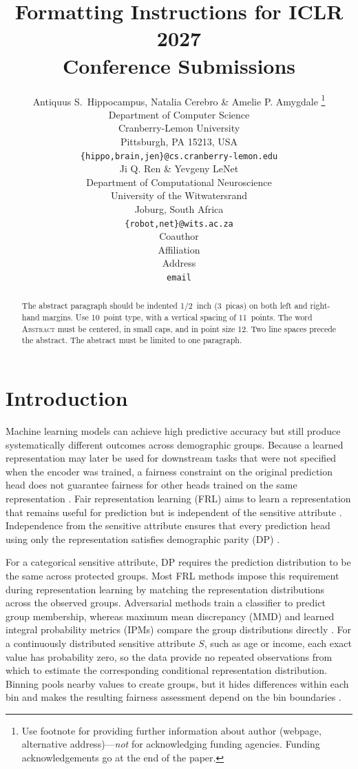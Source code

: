 \documentclass{article} %
\title{Formatting Instructions for ICLR 2027 \\ Conference Submissions}
\author{Antiquus S.~Hippocampus, Natalia Cerebro \& Amelie P. Amygdale \thanks{ Use footnote for providing further information
about author (webpage, alternative address)---\emph{not} for acknowledging
funding agencies.  Funding acknowledgements go at the end of the paper.} \\
Department of Computer Science\\
Cranberry-Lemon University\\
Pittsburgh, PA 15213, USA \\
\texttt{\{hippo,brain,jen\}@cs.cranberry-lemon.edu} \\
\And
Ji Q. Ren \& Yevgeny LeNet \\
Department of Computational Neuroscience \\
University of the Witwatersrand \\
Joburg, South Africa \\
\texttt{\{robot,net\}@wits.ac.za} \\
\AND
Coauthor \\
Affiliation \\
Address \\
\texttt{email}
}
\begin{document}
\maketitle

\begin{abstract}
The abstract paragraph should be indented 1/2~inch (3~picas) on both left and
right-hand margins. Use 10~point type, with a vertical spacing of 11~points.
The word \textsc{Abstract} must be centered, in small caps, and in point size 12. Two
line spaces precede the abstract. The abstract must be limited to one
paragraph.
\end{abstract}

\section{Introduction}

Machine learning models can achieve high predictive accuracy but still produce systematically different outcomes across demographic groups.  Because a learned representation may later be used for downstream tasks that were not specified when the encoder was trained, a fairness constraint on the original prediction head does not guarantee fairness for other heads trained on the same representation \citep{madras2018adversarially}.  Fair representation learning (FRL) aims to learn a representation that remains useful for prediction but is independent of the sensitive attribute \citep{zemel2013learning,madras2018adversarially}.  Independence from the sensitive attribute ensures that every prediction head using only the representation satisfies demographic parity (DP) \citep{dwork2012fairness}.

For a categorical sensitive attribute, DP requires the prediction distribution to be the same across protected groups.  Most FRL methods impose this requirement during representation learning by matching the representation distributions across the observed groups.  Adversarial methods train a classifier to predict group membership, whereas maximum mean discrepancy (MMD) and learned integral probability metrics (IPMs) compare the group distributions directly \citep{edwards2016censoring,louizos2016variational,madras2018adversarially,kim2022parametric,deka2023mmdbfair}.  For a continuously distributed sensitive attribute $S$, such as age or income, each exact value has probability zero, so the data provide no repeated observations from which to estimate the corresponding conditional representation distribution.  Binning pools nearby values to create groups, but it hides differences within each bin and makes the resulting fairness assessment depend on the bin boundaries \citep{mary2019continuous,kong2025fair}.
\end{document}
